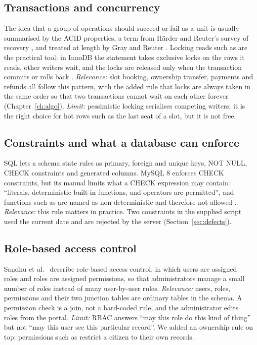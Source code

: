 \subsection{Transactions and concurrency}
The idea that a group of operations should succeed or fail as a unit is usually
summarised by the ACID properties, a term from H\"arder and Reuter's survey of
recovery \cite{harder1983}, and treated at length by Gray and Reuter \cite{gray1993}.
Locking reads such as  are the practical tool: in InnoDB the
statement takes exclusive locks on the rows it reads, other writers wait, and the locks
are released only when the transaction commits or rolls back \cite{mysql-locking}.
\emph{Relevance:} slot booking, ownership transfer, payments and refunds all follow this
pattern, with the added rule that locks are always taken in the same order so that two
transactions cannot wait on each other forever (Chapter~\ref{ch:algo}).
\emph{Limit:} pessimistic locking serialises competing writers; it is the right choice
for hot rows such as the last seat of a slot, but it is not free.

\subsection{Constraints and what a database can enforce}
SQL lets a schema state rules as primary, foreign and unique keys, NOT NULL, CHECK
constraints and generated columns. MySQL 8 enforces CHECK constraints, but its manual
limits what a CHECK expression may contain: ``literals, deterministic built-in
functions, and operators are permitted'', and functions such as  are named as
non-deterministic and therefore not allowed \cite{mysql-check}.
\emph{Relevance:} this rule matters in practice. Two constraints in the supplied script
used the current date and are rejected by the server (Section~\ref{sec:defects}).

\subsection{Role-based access control}
Sandhu et al.\ \cite{sandhu1996} describe role-based access control, in which users are
assigned roles and roles are assigned permissions, so that administrators manage a small
number of roles instead of many user-by-user rules.
\emph{Relevance:} users, roles, permissions and their two junction tables are ordinary
tables in the schema. A permission check is a join, not a hard-coded rule, and the
administrator edits roles from the portal.
\emph{Limit:} RBAC answers ``may this role do this kind of thing'' but not ``may this
user see this particular record''. We added an ownership rule on top: permissions such
as  restrict a citizen to their own records.

